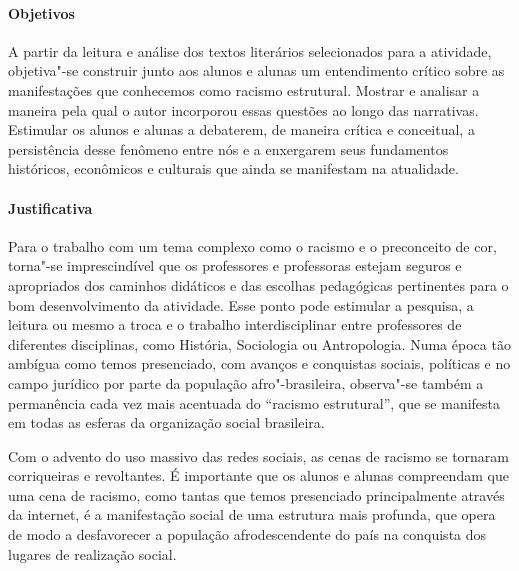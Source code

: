 \documentclass[11pt]{extarticle}
\begin{document}
\paragraph{Objetivos} A partir da leitura e análise dos textos literários
selecionados para a atividade, objetiva"-se construir junto aos alunos e
alunas um entendimento crítico sobre as manifestações que conhecemos
como racismo estrutural. Mostrar e analisar a maneira pela qual o autor
incorporou essas questões ao longo das narrativas. Estimular os alunos e
alunas a debaterem, de maneira crítica e conceitual, a persistência
desse fenômeno entre nós e a enxergarem seus fundamentos históricos,
econômicos e culturais que ainda se manifestam na atualidade.

\paragraph{Justificativa} Para o trabalho com um tema complexo como o
racismo e o preconceito de cor, torna"-se imprescindível que os
professores e professoras estejam seguros e apropriados dos caminhos
didáticos e das escolhas pedagógicas pertinentes para o bom
desenvolvimento da atividade. Esse ponto pode estimular a pesquisa,
a leitura ou mesmo a troca e o trabalho interdisciplinar entre professores
de diferentes disciplinas, como História, Sociologia ou Antropologia.
Numa época tão ambígua como temos presenciado, com avanços e conquistas
sociais, políticas e no campo jurídico por parte da população
afro"-brasileira, observa"-se também a permanência cada vez mais acentuada
do ``racismo estrutural'', que se manifesta em todas as esferas da
organização social brasileira.

Com o advento do uso massivo das redes sociais, as cenas de racismo se
tornaram corriqueiras e revoltantes. É importante que os alunos e alunas
compreendam que uma cena de racismo, como tantas que temos presenciado
principalmente através da internet, é a manifestação social de uma
estrutura mais profunda, que opera de modo a desfavorecer a população
afrodescendente do país na conquista dos lugares de realização social.
\end{document}
